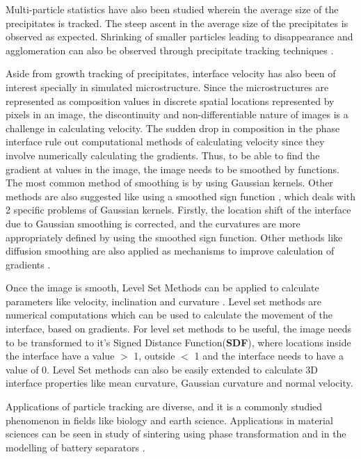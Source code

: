 \documentclass[12pt, a4paper]{report}
\begin{document}
Multi-particle statistics have also been studied wherein the average size of the precipitates is tracked. The steep ascent in the average size of the precipitates is observed as expected. Shrinking of smaller particles leading to disappearance and agglomeration can also be observed through precipitate tracking techniques \cite{10roosen1998simulations}.

Aside from growth tracking of precipitates, interface velocity has also been of interest specially in simulated microstructure. Since the microstructures are represented as composition values in discrete spatial locations represented by pixels in an image, the discontinuity and non-differentiable nature of images is a challenge in calculating velocity. The sudden drop in composition in the phase interface rule out computational methods of calculating velocity since they involve numerically calculating the gradients. Thus, to be able to find the gradient at values in the image, the image needs to be smoothed by functions. The most common method of smoothing is by using Gaussian kernels. Other methods are also suggested like using a smoothed sign function \cite{22park2014application}, which deals with 2 specific problems of Gaussian kernels. Firstly, the location shift of the interface due to Gaussian smoothing is corrected, and the curvatures are more appropriately defined by using the smoothed sign function. Other methods like diffusion smoothing are also applied as mechanisms to improve calculation of gradients . 

Once the image is smooth, Level Set Methods can be applied to calculate parameters like velocity, inclination and curvature \cite{23sethian1999level}. Level set methods are numerical computations which can be used to calculate the movement of the interface, based on gradients. For level set methods to be useful, the image needs to be transformed to it's Signed Distance Function(\textbf{SDF}), where locations inside the interface have a value $>$ 1, outside $<$ 1 and the interface needs to have a value of 0. Level Set methods can also be easily extended to calculate 3D interface properties \cite{22park2014application} like mean curvature, Gaussian curvature and normal velocity.

Applications of particle tracking are diverse, and it is a commonly studied phenomenon in fields like biology and earth science. Applications in material sciences can be seen in study of sintering using phase transformation \cite{1biswas2018phase} and in the modelling of battery separators \cite{11xu2019stochastic}.
\end{document}
